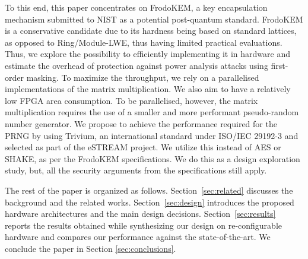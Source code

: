 To this end, this paper concentrates on FrodoKEM, a key encapsulation mechanism submitted to NIST as a potential post-quantum standard. FrodoKEM is a conservative candidate due to its hardness being based on standard lattices, as opposed to Ring/Module-LWE, thus having limited practical evaluations. Thus, we explore the possibility to efficiently implementing it in hardware and estimate the overhead of protection against power analysis attacks using first-order masking. To maximize the throughput, we rely on a parallelised implementations of the matrix multiplication. We also aim to have a relatively low FPGA area consumption. To be parallelised, however, the matrix multiplication requires the use of a smaller and more performant pseudo-random number generator. We propose to achieve the performance required for the PRNG by using Trivium, an international standard under ISO/IEC 29192-3 \cite{ISO} and selected as part of the eSTREAM project. We utilize this instead of AES or SHAKE, as per the FrodoKEM specifications. We do this as a design exploration study, but, all the security arguments from the specifications still apply.

The rest of the paper is organized as follows. Section~\ref{sec:related} discusses the background and the related works. Section~\ref{sec:design} introduces the proposed hardware architectures and the main design decisions. Section~\ref{sec:results} reports the results obtained while synthesizing our design on re-configurable hardware and compares our performance against the state-of-the-art. We conclude the paper in Section \ref{sec:conclusions}.